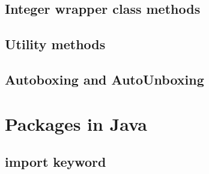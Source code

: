 \documentclass[14pt,fleqn]{extbook} %
\begin{document}
\section{Integer wrapper class methods}

\section{Utility methods}

\section{Autoboxing and AutoUnboxing}



%
%
%

\chapter{Packages in Java}
\section{import keyword}

%
\end{document}
